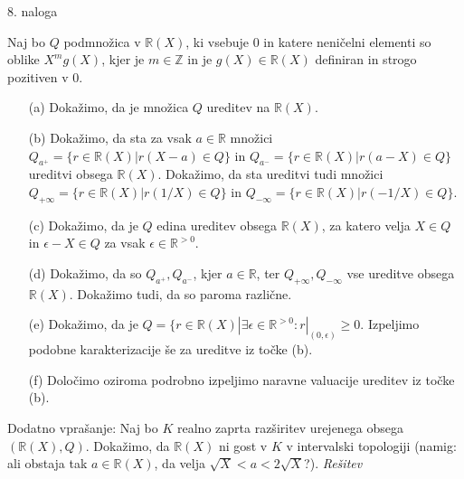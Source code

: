 \documentclass[a4paper, 12pt]{article}
\newcommand{\Z}{\mathbb{Z}}
\newcommand{\R}{\mathbb{R}}
\begin{document}
\begin{flushleft}
8. naloga
\end{flushleft}
Naj bo $Q$ podmnožica v $\R(X)$, ki vsebuje 0 in katere neničelni elementi so oblike $X^m g(X)$, kjer je $m\in \Z$ in je $g(X) \in \R(X)$ definiran in strogo pozitiven v 0.
\begin{enumerate}
\item[(a)] Dokažimo, da je množica $Q$ ureditev na $\R(X)$.
\item[(b)] Dokažimo, da sta za vsak $a\in \R$ množici $Q_{a^+} = \{r\in \R(X)| r(X-a) \in Q\}$ in $Q_{a^-} = \{ r \in \R(X)| r(a-X) \in Q\}$ ureditvi obsega $\R(X)$. Dokažimo, da sta ureditvi tudi množici $Q_{+\infty} = \{r\in \R(X)|r(1/X) \in Q\}$ in $Q_{-\infty} = \{r \in \R(X)| r(-1/X) \in Q\}$. 
\item[(c)] Dokažimo, da je $Q$ edina ureditev obsega $\R(X)$, za katero velja $X\in Q$ in $\epsilon - X \in Q$ za vsak $\epsilon \in \R^{>0}$.
\item[(d)] Dokažimo, da so $Q_{a^+}, Q_{a^-}$, kjer $a\in \R$, ter $Q_{+\infty}, Q_{-\infty}$ vse ureditve obsega $\R(X)$. Dokažimo tudi, da so paroma različne.
\item[(e)] Dokažimo, da je $Q = \{r\in \R(X)| \exists \epsilon \in \R^{>0}: r|_{(0,\epsilon)} \ge 0$. Izpeljimo podobne karakterizacije še za ureditve iz točke (b).
\item[(f)] Določimo oziroma podrobno izpeljimo naravne valuacije ureditev iz točke (b).
\end{enumerate}
Dodatno vprašanje: Naj bo $K$ realno zaprta razširitev urejenega obsega $(\R(X),Q)$. Dokažimo, da $\R(X)$ ni gost v $K$ v intervalski topologiji (namig: ali obstaja tak $a \in \R(X)$, da velja $\sqrt{X} < a < 2\sqrt{X}$?).
\emph{Rešitev}
\end{document}
